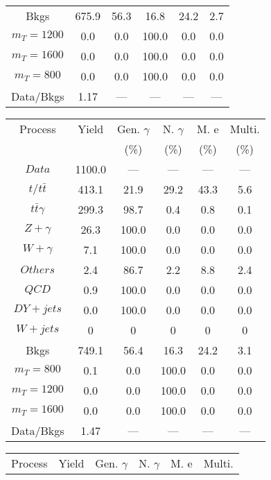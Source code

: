 \begin{figure}
\begin{minipage}[c]{0.32\textwidth}
{\begin{tabular}{cccccc}
Bkgs &  675.9 &  56.3 &  16.8 &  24.2 &  2.7\\
$ m_{T} = 1200 $ &  0.0 &  0.0 &  100.0 &  0.0 &  0.0\\
$ m_{T} = 1600 $ &  0.0 &  0.0 &  100.0 &  0.0 &  0.0\\
$ m_{T} = 800 $ &  0.0 &  0.0 &  100.0 &  0.0 &  0.0\\
Data/Bkgs &  1.17 &  --- &  --- &  --- &  ---\\
\hline
\end{tabular}
}
\end{minipage}
\begin{minipage}[c]{0.32\textwidth}
\centering
\tiny{
\begin{tabular}{cccccc}
\hline
Process & Yield & Gen. $\gamma$ & N. $\gamma$ & M. e & Multi. \\
 &  & (\%) & (\%) & (\%) & (\%)  \\
\hline
                                                                      $ Data $ &  1100.0 &  --- &  --- &  --- &  ---\\
$ t/t\bar{t} $ &  413.1 &  21.9 &  29.2 &  43.3 &  5.6\\
$ t\bar{t}\gamma $ &  299.3 &  98.7 &  0.4 &  0.8 &  0.1\\
$ Z+\gamma $ &  26.3 &  100.0 &  0.0 &  0.0 &  0.0\\
$ W+\gamma $ &  7.1 &  100.0 &  0.0 &  0.0 &  0.0\\
$ Others $ &  2.4 &  86.7 &  2.2 &  8.8 &  2.4\\
$ QCD $ &  0.9 &  100.0 &  0.0 &  0.0 &  0.0\\
$ DY+jets $ &  0.0 &  100.0 &  0.0 &  0.0 &  0.0\\
$ W+jets $ &  0 &  0 &  0 &  0 &  0\\
Bkgs &  749.1 &  56.4 &  16.3 &  24.2 &  3.1\\
$ m_{T} = 800 $ &  0.1 &  0.0 &  100.0 &  0.0 &  0.0\\
$ m_{T} = 1200 $ &  0.0 &  0.0 &  100.0 &  0.0 &  0.0\\
$ m_{T} = 1600 $ &  0.0 &  0.0 &  100.0 &  0.0 &  0.0\\
Data/Bkgs &  1.47 &  --- &  --- &  --- &  ---\\
\hline
\end{tabular}
}
\end{minipage}
\begin{minipage}[c]{0.32\textwidth}
\centering
\tiny{
\begin{tabular}{cccccc}
\hline
Process & Yield & Gen. $\gamma$ & N. $\gamma$ & M. e & Multi. \\

\end{tabular}}
\end{minipage}
\end{figure}
